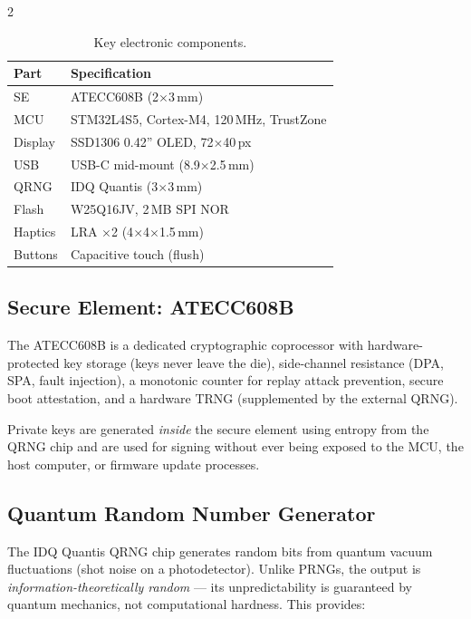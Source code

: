 \documentclass[11pt,a4paper]{article}
\begin{document}
\begin{multicols}{2}
\begin{table}[H]
  \centering
  \small
  \caption{Key electronic components.}
  \label{tab:components}
  \begin{tabularx}{\columnwidth}{lX}
    \toprule
    \textbf{Part} & \textbf{Specification} \\
    \midrule
    SE & ATECC608B (2$\times$3\,mm) \\
    MCU & STM32L4S5, Cortex-M4, 120\,MHz, TrustZone \\
    Display & SSD1306 0.42'' OLED, 72$\times$40\,px \\
    USB & USB-C mid-mount (8.9$\times$2.5\,mm) \\
    QRNG & IDQ Quantis (3$\times$3\,mm) \\
    Flash & W25Q16JV, 2\,MB SPI NOR \\
    Haptics & LRA $\times$2 (4$\times$4$\times$1.5\,mm) \\
    Buttons & Capacitive touch (flush) \\
    \bottomrule
  \end{tabularx}
\end{table}

\subsection{Secure Element: ATECC608B}

The ATECC608B is a dedicated cryptographic coprocessor with
hardware-protected key storage (keys never leave the die),
side-channel resistance (DPA, SPA, fault injection),
a monotonic counter for replay attack prevention,
secure boot attestation, and a hardware TRNG
(supplemented by the external QRNG).

Private keys are generated \emph{inside} the secure element using entropy
from the QRNG chip and are used for signing without ever being exposed
to the MCU, the host computer, or firmware update processes.

\subsection{Quantum Random Number Generator}

The IDQ Quantis QRNG chip generates random bits from quantum vacuum
fluctuations (shot noise on a photodetector). Unlike PRNGs, the output
is \emph{information-theoretically random} --- its unpredictability is
guaranteed by quantum mechanics, not computational hardness. This
provides:


\end{multicols}
\end{document}

